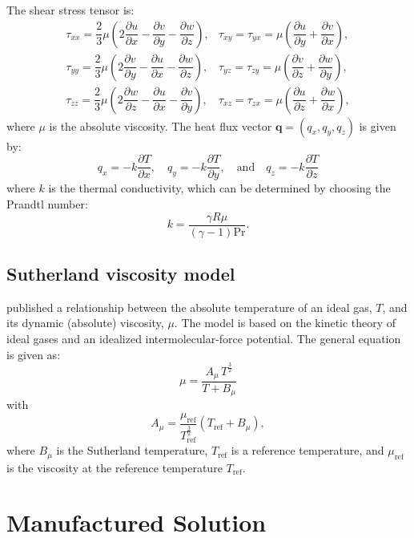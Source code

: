 \documentclass[10pt]{article}
\newcommand{\diff}[2] {\dfrac{\partial #1}{\partial #2}}
\begin{document}
The shear stress tensor is:
\begin{equation}
 \begin{array}{lll}
  \tau_{xx}= \dfrac{2}{3}  \mu \left( 2 \diff{u}{x} - \diff{v}{y} -\diff{w}{z} \right),
  &\tau_{xy}= \tau_{yx}=\mu \left( \diff{u}{y} + \diff{v}{x}\right),\\
  \tau_{yy}= \dfrac{2}{3}  \mu \left( 2 \diff{v}{y} - \diff{u}{x} -\diff{w}{z} \right),
  &\tau_{yz}= \tau_{zy}=\mu \left( \diff{v}{z} + \diff{w}{y}\right),\\
  \tau_{zz}= \dfrac{2}{3}  \mu \left( 2 \diff{w}{z} - \diff{u}{x} -\diff{v}{y} \right),
  &\tau_{xz}= \tau_{zx}=\mu \left( \diff{u}{z} + \diff{w}{x}\right),
 \end{array}
\end{equation}
where $\mu$ is the absolute viscosity. The heat flux vector $\mathbf{q}=(q_x,q_y,q_z)$ is given by:
\begin{equation}
 q_x = - k \diff{T}{x}, \quad q_y = - k \diff{T}{y}, \quad \mbox{and} \quad q_z = - k \diff{T}{z}
 \end{equation}
where $k$ is the thermal conductivity, which can be determined by choosing the Prandtl number:
$$k= \dfrac{\gamma R \mu}{ (\gamma-1) \text{Pr}}.$$



\subsection{Sutherland viscosity model}

\citet{Sutherland1893} published a relationship between the absolute temperature of an ideal gas, $T$,  and its dynamic (absolute) viscosity, $\mu$. The model is based on the kinetic theory of ideal gases and an idealized intermolecular-force potential. The general equation is given as:
\begin{equation}
\label{eq:Sutherland01}
 \mu  =\dfrac{A_\mu \, T^{\frac{3}{2}}}{T+B_\mu}
\end{equation}
with
$$    A_\mu = \dfrac{\mu_\text{ref}}{T_{\text{ref}}^{\frac{3}{2}}}(T_\text{ref} + B_\mu), $$
%
where $B_\mu$ is the Sutherland temperature, $T_{\text{ref}}$ is a reference temperature,  and $\mu_\text{ref}$ is the viscosity at the reference temperature $T_\text{ref}$.


\section{Manufactured Solution}
\end{document}
